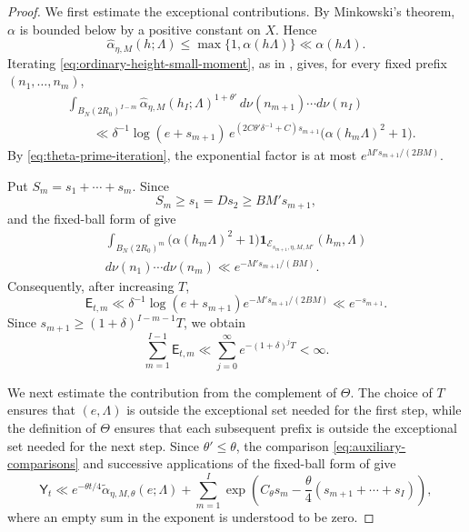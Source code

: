 \documentclass[reqno,11pt]{amsart}
\theoremstyle{definition}
\theoremstyle{remark}
\numberwithin{equation}{section}
\begin{document}
\begin{proof}
We first estimate the exceptional contributions. By Minkowski's theorem,
$\alpha$ is bounded below by a positive constant on $X$. Hence
$$
\widehat\alpha_{\eta,M}(h;\Lambda)
\le
\max\{1,\alpha(h\Lambda)\}
\ll
\alpha(h\Lambda).
$$
Iterating \eqref{eq:ordinary-height-small-moment}, as in
\cite[proof of Theorem~1.9, especially (6.6)]{Kim}, gives, for every fixed
prefix $(n_1,\ldots,n_m)$,
\begin{align*}
&\int_{B_N(2R_0)^{I-m}}
\widehat\alpha_{\eta,M}(h_I;\Lambda)^{1+\theta'}\,
d\nu(n_{m+1})\cdots d\nu(n_I)\\
&\qquad\ll
\delta^{-1}\log(e+s_{m+1})\,
e^{(2C\theta'\delta^{-1}+C)s_{m+1}}
\bigl(\alpha(h_m\Lambda)^2+1\bigr).
\end{align*}
By \eqref{eq:theta-prime-iteration}, the exponential factor is at most
$
e^{M's_{m+1}/(2BM)}.
$

Put $S_m=s_1+\cdots+s_m$. Since
$$
S_m\ge s_1=Ds_2\ge BM's_{m+1},
$$
 and the fixed-ball form of
 give
\begin{multline*}
\int_{B_N(2R_0)^m}
\bigl(\alpha(h_m\Lambda)^2+1\bigr)
\mathbf 1_{\mathcal E_{s_{m+1},\eta,M,M'}}(h_m,\Lambda)\\
d\nu(n_1)\cdots d\nu(n_m)
\ll
e^{-M's_{m+1}/(BM)}.
\end{multline*}
Consequently, after increasing $T$,
$$
\mathsf E_{t,m}
\ll
\delta^{-1}\log(e+s_{m+1})
e^{-M's_{m+1}/(2BM)}
\ll
e^{-s_{m+1}}.
$$
Since
$s_{m+1}\ge(1+\delta)^{I-m-1}T$, we obtain
\begin{equation}\label{eq:iteration-exceptional-sum}
\sum_{m=1}^{I-1}\mathsf E_{t,m}
\ll
\sum_{j=0}^{\infty}e^{-(1+\delta)^jT}
<\infty.
\end{equation}

We next estimate the contribution from the complement of $\Theta$. The
choice of $T$ ensures that $(e,\Lambda)$ is outside the exceptional set
needed for the first step, while the definition of $\Theta$ ensures that
each subsequent prefix is outside the exceptional set needed for the next
step. Since $\theta'\le\theta$, the comparison
\eqref{eq:auxiliary-comparisons} and successive applications of the
fixed-ball form of  give
\begin{equation}\label{eq:iteration-good-bound}
\mathsf Y_t
\ll
e^{-\theta t/4}
\widetilde\alpha_{\eta,M,\theta}(e;\Lambda)
+
\sum_{m=1}^I
\exp\left(
C_\theta s_m
-
\frac{\theta}{4}(s_{m+1}+\cdots+s_I)
\right),
\end{equation}
where an empty sum in the exponent is understood to be zero.


\end{proof}
\end{document}
